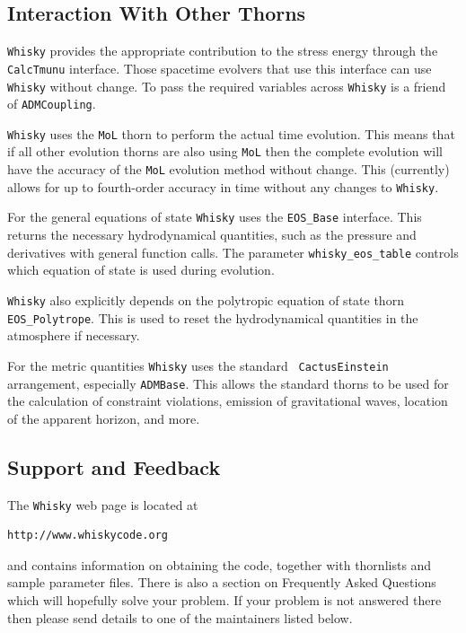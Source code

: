 \documentclass{article}
\begin{document}
\subsection{Interaction With Other Thorns}

{\tt Whisky} provides the appropriate contribution to the stress energy
through the {\tt CalcTmunu} interface. Those spacetime evolvers that
use this interface can use {\tt Whisky} without change. To pass the required
variables across {\tt Whisky} is a friend of {\tt ADMCoupling}.

{\tt Whisky} uses the {\tt MoL} thorn to perform the actual time
evolution. This means that if all other evolution thorns are also
using {\tt MoL} then the complete evolution will have the accuracy of
the {\tt MoL} evolution method without change. This (currently) allows
for up to fourth-order accuracy in time without any changes to {\tt Whisky}.

For the general equations of state {\tt Whisky} uses the {\tt EOS\_Base}
interface. This returns the necessary hydrodynamical quantities, such
as the pressure and derivatives with general function calls. The
parameter {\tt whisky\_eos\_table} controls which equation of state is
used during evolution. 

{\tt Whisky} also explicitly depends on the polytropic equation of state
thorn {\tt EOS\_Polytrope}. This is used to reset the hydrodynamical
quantities in the atmosphere if necessary.

For the metric quantities {\tt Whisky} uses the standard {\tt
  CactusEinstein} arrangement, especially {\tt ADMBase}. This allows
the standard thorns to be used for the calculation of constraint
violations, emission of gravitational waves, location of the apparent
horizon, and more.

\subsection{Support and Feedback}

The {\tt Whisky} web page is located at
\begin{verbatim}
http://www.whiskycode.org
\end{verbatim}
and contains information on obtaining the code, together with
thornlists and sample parameter files. There is also a section on
Frequently Asked Questions which will hopefully solve your problem.
If your problem is not answered there then please send details to one
of the maintainers listed below.
\end{document}
